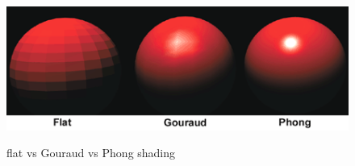 \begin{figure}[thbp]
	\centering
	\scalebox{0.7}
	{\includegraphics{pics/flatVsGouraudVsPhong.png}}
	\caption{flat vs Gouraud vs Phong shading}
	\label{fig:fVsP}
\end{figure}
